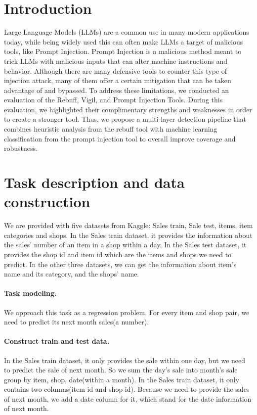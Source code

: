 \documentclass{article}
\begin{document}
\section{Introduction}
Large Language Models (LLMs) are a common use in many modern applications today, while being widely used this can often make LLMs a target of malicious tools, like Prompt Injection. Prompt Injection is a malicious method meant to trick LLMs with malicious inputs that can alter machine instructions and behavior. Although there are many defensive tools to counter this type of injection attack, many of them offer a certain mitigation that can be taken advantage of and bypassed.
To address these limitations, we conducted an evaluation of the Rebuff, Vigil, and Prompt Injection Tools. During this evaluation, we highlighted their complimentary strengths and weaknesses in order to create a stronger tool. Thus, we propose a multi-layer detection pipeline that combines heuristic analysis from the rebuff tool with machine learning classification from the prompt injection tool to overall improve coverage and robustness. 


\section{Task description and data construction}
\label{sec:headings}
We are provided with five datasets from Kaggle: Sales train, Sale test, items, item categories and shops. In the Sales train dataset, it provides the information about the sales’ number of an item in a shop within a day. In the Sales test dataset, it provides the shop id and item id which are the items and shops we need to predict. In the other three datasets, we can get the information about item’s name and its category, and the shops’ name.
\paragraph{Task modeling.}
We approach this task as a regression problem. For every item and shop pair, we need to predict its next month sales(a number).
\paragraph{Construct train and test data.}
In the Sales train dataset, it only provides the sale within one day, but we need to predict the sale of next month. So we sum the day's sale into month's sale group by item, shop, date(within a month).
In the Sales train dataset, it only contains two columns(item id and shop id). Because we need to provide the sales of next month, we add a date column for it, which stand for the date information of next month.
\end{document}
